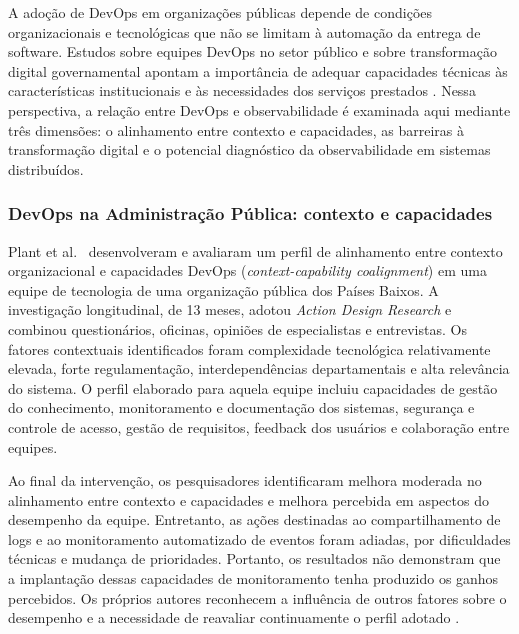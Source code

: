 
A adoção de DevOps em organizações públicas depende de condições organizacionais e tecnológicas que não se limitam à automação da entrega de software. Estudos sobre equipes DevOps no setor público e sobre transformação digital governamental apontam a importância de adequar capacidades técnicas às características institucionais e às necessidades dos serviços prestados \cite{plant2025,figueredo2026}. Nessa perspectiva, a relação entre DevOps e observabilidade é examinada aqui mediante três dimensões: o alinhamento entre contexto e capacidades, as barreiras à transformação digital e o potencial diagnóstico da observabilidade em sistemas distribuídos.

\subsubsection{DevOps na Administração Pública: contexto e capacidades}

Plant et al.~ desenvolveram e avaliaram um perfil de alinhamento entre contexto organizacional e capacidades DevOps (\emph{context-capability coalignment}) em uma equipe de tecnologia de uma organização pública dos Países Baixos. A investigação longitudinal, de 13 meses, adotou \emph{Action Design Research} e combinou questionários, oficinas, opiniões de especialistas e entrevistas. Os fatores contextuais identificados foram complexidade tecnológica relativamente elevada, forte regulamentação, interdependências departamentais e alta relevância do sistema. O perfil elaborado para aquela equipe incluiu capacidades de gestão do conhecimento, monitoramento e documentação dos sistemas, segurança e controle de acesso, gestão de requisitos, feedback dos usuários e colaboração entre equipes.

Ao final da intervenção, os pesquisadores identificaram melhora moderada no alinhamento entre contexto e capacidades e melhora percebida em aspectos do desempenho da equipe. Entretanto, as ações destinadas ao compartilhamento de logs e ao monitoramento automatizado de eventos foram adiadas, por dificuldades técnicas e mudança de prioridades. Portanto, os resultados não demonstram que a implantação dessas capacidades de monitoramento tenha produzido os ganhos percebidos. Os próprios autores reconhecem a influência de outros fatores sobre o desempenho e a necessidade de reavaliar continuamente o perfil adotado \cite{plant2025}.

